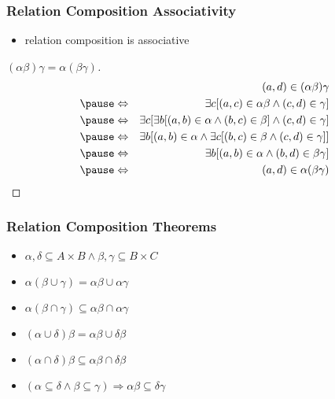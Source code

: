 \documentclass[dvipsnames]{beamer}
\begin{document}
\begin{frame}
  \frametitle{Relation Composition Associativity}

  \begin{itemize}
    \item relation composition is associative
  \end{itemize}

  \pause
  \begin{proof}[$(\alpha \beta) \gamma = \alpha (\beta \gamma)$]
    \begin{eqnarray*}
      &                 & (a,d) \in (\alpha \beta)\gamma\\\pause
      & \Leftrightarrow & \exists c [(a,c) \in \alpha \beta
                              \wedge (c,d) \in \gamma]\\\pause
      & \Leftrightarrow & \exists c [\exists b [(a,b) \in \alpha
                                         \wedge (b,c) \in \beta]
                                         \wedge (c,d) \in \gamma]\\\pause
      & \Leftrightarrow & \exists b [(a,b) \in \alpha
                              \wedge \exists c [(b,c) \in \beta
                              \wedge (c,d) \in \gamma]]\\\pause
      & \Leftrightarrow & \exists b [(a,b) \in \alpha
                              \wedge (b,d) \in \beta \gamma]\\\pause
      & \Leftrightarrow & (a,d) \in \alpha (\beta \gamma)
    \end{eqnarray*}
  \end{proof}
\end{frame}

\begin{frame}
  \frametitle{Relation Composition Theorems}

  \begin{itemize}
    \item $\alpha , \delta \subseteq A \times B \wedge
           \beta , \gamma \subseteq B \times C$

    \medskip
    \item $\alpha (\beta \cup \gamma) = \alpha \beta \cup \alpha \gamma$

    \item $\alpha (\beta \cap \gamma)
      \subseteq \alpha \beta \cap \alpha \gamma$

    \item $(\alpha \cup \delta) \beta = \alpha \beta \cup \delta \beta$

    \item $(\alpha \cap \delta) \beta
      \subseteq \alpha \beta \cap \delta \beta$

    \item $(\alpha \subseteq \delta \wedge \beta \subseteq \gamma)
      \Rightarrow \alpha \beta \subseteq \delta \gamma$
  \end{itemize}
\end{frame}
\end{document}
